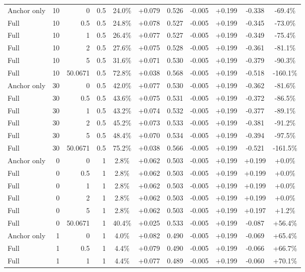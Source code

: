 \begin{table}[htbp]
\begin{tabular}{lrrrccccccc}
Anchor only & 10 & 0 & 0.5 & 24.0\% & +0.079 & 0.526 & -0.005 & +0.199 & -0.338 & -69.4\% \\
Full & 10 & 0.5 & 0.5 & 24.8\% & +0.078 & 0.527 & -0.005 & +0.199 & -0.345 & -73.0\% \\
Full & 10 & 1 & 0.5 & 26.4\% & +0.077 & 0.527 & -0.005 & +0.199 & -0.349 & -75.4\% \\
Full & 10 & 2 & 0.5 & 27.6\% & +0.075 & 0.528 & -0.005 & +0.199 & -0.361 & -81.1\% \\
Full & 10 & 5 & 0.5 & 31.6\% & +0.071 & 0.530 & -0.005 & +0.199 & -0.379 & -90.3\% \\
Full & 10 & 50.0671 & 0.5 & 72.8\% & +0.038 & 0.568 & -0.005 & +0.199 & -0.518 & -160.1\% \\
Anchor only & 30 & 0 & 0.5 & 42.0\% & +0.077 & 0.530 & -0.005 & +0.199 & -0.362 & -81.6\% \\
Full & 30 & 0.5 & 0.5 & 43.6\% & +0.075 & 0.531 & -0.005 & +0.199 & -0.372 & -86.5\% \\
Full & 30 & 1 & 0.5 & 43.2\% & +0.074 & 0.532 & -0.005 & +0.199 & -0.377 & -89.1\% \\
Full & 30 & 2 & 0.5 & 45.2\% & +0.073 & 0.533 & -0.005 & +0.199 & -0.381 & -91.2\% \\
Full & 30 & 5 & 0.5 & 48.4\% & +0.070 & 0.534 & -0.005 & +0.199 & -0.394 & -97.5\% \\
Full & 30 & 50.0671 & 0.5 & 75.2\% & +0.038 & 0.566 & -0.005 & +0.199 & -0.521 & -161.5\% \\
Anchor only & 0 & 0 & 1 & 2.8\% & +0.062 & 0.503 & -0.005 & +0.199 & +0.199 & +0.0\% \\
Full & 0 & 0.5 & 1 & 2.8\% & +0.062 & 0.503 & -0.005 & +0.199 & +0.199 & +0.0\% \\
Full & 0 & 1 & 1 & 2.8\% & +0.062 & 0.503 & -0.005 & +0.199 & +0.199 & +0.0\% \\
Full & 0 & 2 & 1 & 2.8\% & +0.062 & 0.503 & -0.005 & +0.199 & +0.199 & +0.0\% \\
Full & 0 & 5 & 1 & 2.8\% & +0.062 & 0.503 & -0.005 & +0.199 & +0.197 & +1.2\% \\
Full & 0 & 50.0671 & 1 & 40.4\% & +0.025 & 0.533 & -0.005 & +0.199 & -0.087 & +56.4\% \\
Anchor only & 1 & 0 & 1 & 4.0\% & +0.082 & 0.490 & -0.005 & +0.199 & -0.069 & +65.4\% \\
Full & 1 & 0.5 & 1 & 4.4\% & +0.079 & 0.490 & -0.005 & +0.199 & -0.066 & +66.7\% \\
Full & 1 & 1 & 1 & 4.4\% & +0.077 & 0.489 & -0.005 & +0.199 & -0.060 & +70.1\% \\

\end{tabular}
\end{table}
